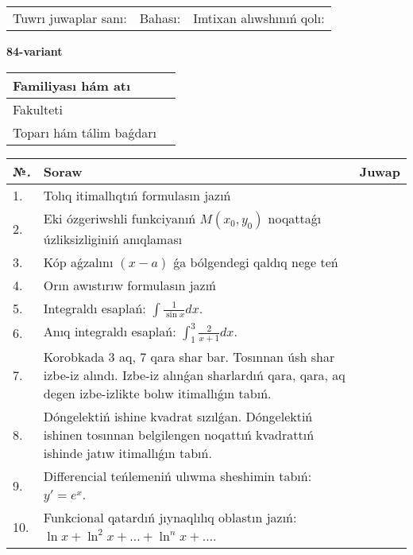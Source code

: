 \documentclass{article}
\begin{document}
\vspace{1cm}

\begin{tabular}{ c c c }
Tuwrı juwaplar sanı: \underline{\hspace{2cm}} & Bahası: \underline{\hspace{2cm}} & Imtixan alıwshınıń qolı: \underline{\hspace{2cm}} \\
\end{tabular}

\newpage

\begin{center}\textbf{84-variant}\end{center}

\bgroup
\def\arraystretch{1.5}
\begin{tabular}{ |m{6cm}|m{10cm}| }
  \hline
  Familiyası hám atı & \\
  \hline
  Fakulteti &\\
  \hline
  Toparı hám tálim baǵdarı & \\
  \hline
\end{tabular}
\egroup

\vspace{0.5cm}

\bgroup
\def\arraystretch{2}
\begin{tabular}{ |l|m{8cm}|m{7cm}| }
  \hline
  №. & Soraw & Juwap \\
  \hline
  1. & Tolıq itimallıqtıń formulasın jazıń &  \\
  \hline
  2. & Eki ózgeriwshli funkciyanıń $M(x_{0} , y_{0})$ noqattaǵı úzliksizliginiń anıqlaması &  \\
  \hline
  3. & Kóp aǵzalını $(x - a)$ ǵa bólgendegi qaldıq nege teń &  \\
  \hline
  4. & Orın awıstırıw formulasın jazıń &  \\
  \hline
  5. & Integraldı esaplań: $\displaystyle\int {\frac{1}{\sin x}dx} $. &  \\
  \hline
  6. & Anıq integraldı esaplań: $\displaystyle\int_{1}^{3}{\frac{2}{x + 1}dx}$. &  \\
  \hline
  7. & Korobkada 3 aq, 7 qara shar bar. Tosınnan úsh shar izbe-iz alındı. Izbe-iz alınǵan sharlardıń qara, qara, aq degen izbe-izlikte bolıw itimallıǵın tabıń. &  \\
  \hline
  8. & Dóngelektiń ishine kvadrat sızılǵan. Dóngelektiń ishinen tosınnan belgilengen noqattıń kvadrattıń ishinde jatıw itimallıǵın tabıń. &  \\
  \hline
  9. & Differencial teńlemeniń ulıwma sheshimin tabıń: $y'=e^{x}$. &  \\
  \hline
  10. & Funkcional qatardıń jıynaqlılıq oblastın jazıń: $\ln x + \ln^{2}x + \ldots + \ln^{n}x + \ldots$. &  \\
  \hline
\end{tabular}
\egroup
\end{document}
